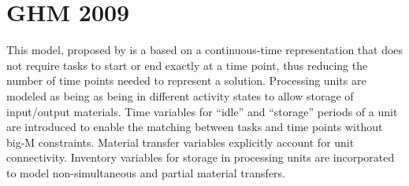 \section{GHM 2009}
This model, proposed by \cite{Gimenez} is a based on a continuous-time representation that does not require tasks to start or end exactly at a time point, thus reducing the number of time points needed to represent a solution. Processing units are modeled as being as being in different activity states to allow storage of input/output materials. Time variables for ``idle'' and ``storage'' periods of a unit are introduced to enable the matching between tasks and time points without big-M constraints. Material transfer variables explicitly account for unit connectivity. Inventory variables for storage in processing units are incorporated to model non-simultaneous and partial material transfers. 
